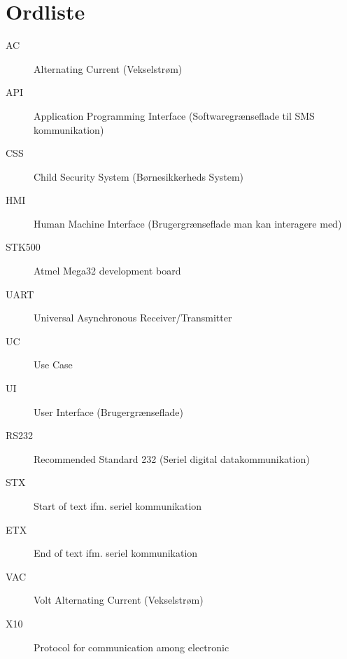 \chapter{Ordliste}

\begin{description}

\item[AC] Alternating Current (Vekselstrøm)
\item[API] Application Programming Interface (Softwaregrænseflade til SMS kommunikation)
\item[CSS] Child Security System (Børnesikkerheds System)
\item[HMI] Human Machine Interface (Brugergrænseflade man kan interagere med)
\item[STK500] Atmel Mega32 development board
\item[UART] Universal Asynchronous Receiver/Transmitter
\item[UC] Use Case
\item[UI] User Interface (Brugergrænseflade)
\item[RS232] Recommended Standard 232 (Seriel digital datakommunikation)
\item[STX] Start of text ifm. seriel kommunikation
\item[ETX] End of text ifm. seriel kommunikation
\item[VAC] Volt Alternating Current (Vekselstrøm)
\item[X10] Protocol for communication among electronic

\end{description}